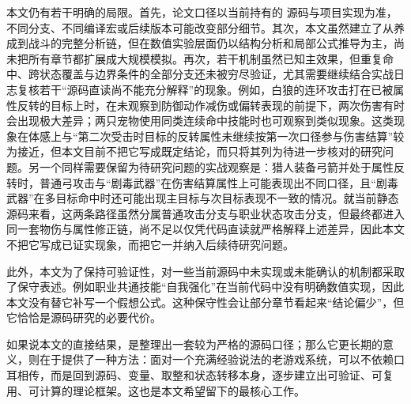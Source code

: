 本文仍有若干明确的局限。首先，论文口径以当前持有的  源码与项目实现为准，不同分支、不同编译宏或后续版本可能改变部分细节。其次，本文虽然建立了从养成到战斗的完整分析链，但在数值实验层面仍以结构分析和局部公式推导为主，尚未把所有章节都扩展成大规模模拟。再次，若干机制虽然已知主效果，但重复命中、跨状态覆盖与边界条件的全部分支还未被穷尽验证，尤其需要继续结合实战日志复核若干“源码直读尚不能充分解释”的现象。例如，白狼的连环攻击打在已被属性反转的目标上时，在未观察到防御动作减伤或偏转表现的前提下，两次伤害有时会出现极大差异；两只宠物使用同类连续命中技能时也可观察到类似现象。这类现象在体感上与“第二次受击时目标的反转属性未继续按第一次口径参与伤害结算”较为接近，但本文目前不把它写成既定结论，而只将其列为待进一步核对的研究问题。另一个同样需要保留为待研究问题的实战观察是：猎人装备弓箭并处于属性反转时，普通弓攻击与“剧毒武器”在伤害结算属性上可能表现出不同口径，且“剧毒武器”在多目标命中时还可能出现主目标与次目标表现不一致的情况。就当前静态源码来看，这两条路径虽然分属普通攻击分支与职业状态攻击分支，但最终都进入同一套物伤与属性修正链，尚不足以仅凭代码直读就严格解释上述差异，因此本文不把它写成已证实现象，而把它一并纳入后续待研究问题。

此外，本文为了保持可验证性，对一些当前源码中未实现或未能确认的机制都采取了保守表述。例如职业共通技能“自我强化”在当前代码中没有明确数值实现，因此本文没有替它补写一个假想公式。这种保守性会让部分章节看起来“结论偏少”，但它恰恰是源码研究的必要代价。

如果说本文的直接结果，是整理出一套较为严格的源码口径；那么它更长期的意义，则在于提供了一种方法：面对一个充满经验说法的老游戏系统，可以不依赖口耳相传，而是回到源码、变量、取整和状态转移本身，逐步建立出可验证、可复用、可计算的理论框架。这也是本文希望留下的最核心工作。

